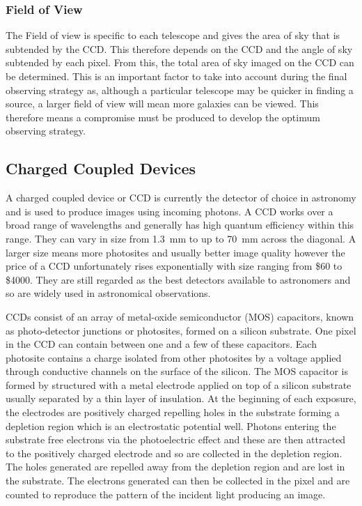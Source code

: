 		\subsubsection{Field of View} %
		\label{ssub:field_of_view}
			The Field of view is specific to each telescope and gives the area of sky that is subtended by the CCD. This therefore depends on the CCD and the angle of sky subtended by each pixel. From this, the total area of sky imaged on the CCD can be determined. This is an important factor to take into account during the final observing strategy as, although a particular telescope may be quicker in finding a source, a larger field of view will mean more galaxies can be viewed. This therefore means a compromise must be produced to develop the optimum observing strategy.

	\subsection{Charged Coupled Devices} %
	\label{sub:charged_coupled_devices}
		A charged coupled device or CCD is currently the detector of choice in astronomy and is used to produce images using incoming photons. A CCD works over a broad range of wavelengths and generally has high quantum efficiency within this range. They can vary in size from \SI{1.3}{\milli\metre} to up to \SI{70}{\milli\metre} across the diagonal. A larger size means more photosites and usually better image quality however the price of a CCD unfortunately rises exponentially with size ranging from \$60 to \$4000. They are still regarded as the best detectors available to astronomers and so are widely used in astronomical observations.

		CCDs consist of an array of metal-oxide semiconductor (MOS) capacitors, known as photo-detector junctions or photosites, formed on a silicon substrate. One pixel in the CCD can contain between one and a few of these capacitors. Each photosite contains a charge isolated from other photosites by a voltage applied through conductive channels on the surface of the silicon\cite{Diffraction_Limited_Imaging_Saha}. The MOS capacitor is formed by structured with a metal electrode applied on top of a silicon substrate usually separated by a thin layer of insulation. At the beginning of each exposure, the electrodes are positively charged repelling holes in the substrate forming a depletion region which is an electrostatic potential well. Photons entering the substrate free electrons via the photoelectric effect and these are then attracted to the positively charged electrode and so are collected in the depletion region. The holes generated are repelled away from the depletion region and are lost in the substrate. The electrons generated can then be collected in the pixel and are counted to reproduce the pattern of the incident light producing an image.

